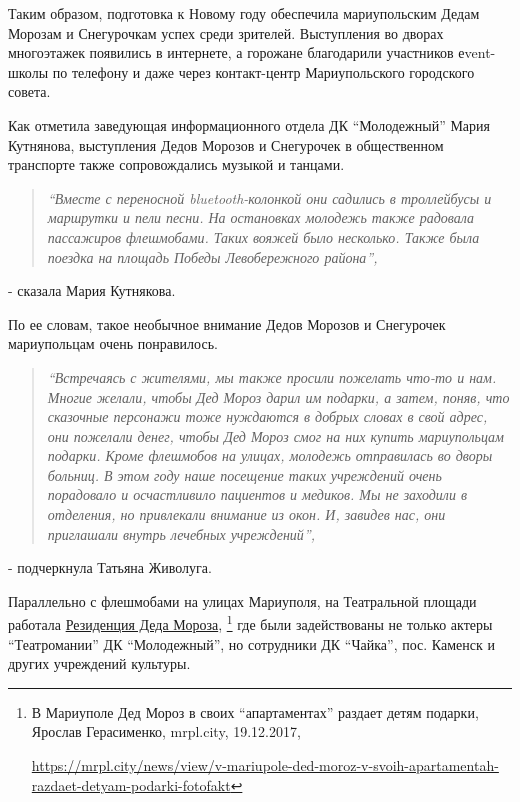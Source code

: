 
Таким образом, подготовка к Новому году обеспечила мариупольским Дедам Морозам
и Снегурочкам успех среди зрителей. Выступления во дворах многоэтажек появились
в интернете, а горожане благодарили участников еvent-школы по телефону и даже
через контакт-центр Мариупольского городского совета.

Как отметила заведующая информационного отдела ДК \enquote{Молодежный} Мария Кутнянова,
выступления Дедов Морозов и Снегурочек в общественном транспорте также
сопровождались музыкой и танцами.


\begin{quote}
\em\enquote{Вместе с переносной bluetooth-колонкой они садились в троллейбусы и маршрутки
и пели песни. На остановках молодежь также радовала пассажиров флешмобами.
Таких вояжей было несколько. Также была поездка на площадь Победы Левобережного
района}, 
\end{quote}

- сказала Мария Кутнякова.

По ее словам, такое необычное внимание Дедов Морозов и Снегурочек мариупольцам
очень понравилось.


\begin{quote}
\em\enquote{Встречаясь с жителями, мы также просили пожелать что-то и нам. Многие желали,
чтобы Дед Мороз дарил им подарки, а затем, поняв, что сказочные персонажи тоже
нуждаются в добрых словах в свой адрес, они пожелали денег, чтобы Дед Мороз
смог на них купить мариупольцам подарки. Кроме флешмобов на улицах, молодежь
отправилась во дворы больниц. В этом году наше посещение таких учреждений очень
порадовало и осчастливило пациентов и медиков. Мы не заходили в отделения, но
привлекали внимание из окон. И, завидев нас, они приглашали внутрь лечебных
учреждений}, 
\end{quote}
- подчеркнула Татьяна Живолуга.

Параллельно с флешмобами на улицах Мариуполя, на Театральной площади работала
\href{https://mrpl.city/news/view/v-mariupole-ded-moroz-v-svoih-apartamentah-razdaet-detyam-podarki-fotofakt}{Резиденция Деда Мороза},%
\footnote{В Мариуполе Дед Мороз в своих \enquote{апартаментах} раздает детям подарки, Ярослав Герасименко, mrpl.city, 19.12.2017, \par%
\url{https://mrpl.city/news/view/v-mariupole-ded-moroz-v-svoih-apartamentah-razdaet-detyam-podarki-fotofakt}
} %
где были задействованы не только актеры \enquote{Театромании}
ДК \enquote{Молодежный}, но сотрудники ДК \enquote{Чайка}, пос. Каменск и других учреждений
культуры.

